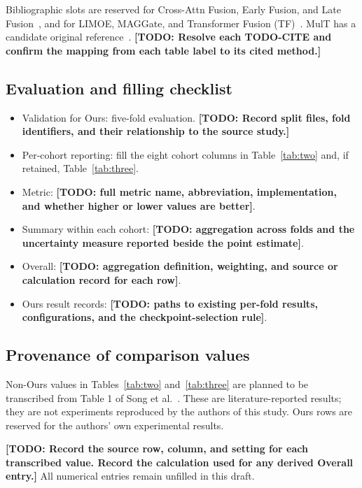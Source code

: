 \documentclass[pdflatex,sn-vancouver-num]{sn-jnl}
\newcommand{\TODO}[1]{\textbf{[TODO: #1]}}
\begin{document}
Bibliographic slots are reserved for Cross-Attn Fusion,
Early Fusion, and Late Fusion~\cite{todo_cross_attention_fusion,
todo_early_fusion,todo_late_fusion}, and for LIMOE, MAGGate, and
Transformer Fusion (TF)~\cite{todo_limoe,todo_maggate,
todo_transformer_fusion}.
MulT has a candidate original reference~\cite{tsai2019mult}.
\TODO{Resolve each TODO-CITE and confirm the mapping from each
table label to its cited method.}

\subsection{Evaluation and filling checklist}
\begin{itemize}
  \item Validation for Ours: five-fold evaluation.
  \TODO{Record split files, fold identifiers, and their relationship
  to the source study.}
  \item Per-cohort reporting: fill the eight cohort columns in
  Table~\ref{tab:two} and, if retained, Table~\ref{tab:three}.
  \item Metric: \TODO{full metric name, abbreviation, implementation,
  and whether higher or lower values are better}.
  \item Summary within each cohort: \TODO{aggregation across folds
  and the uncertainty measure reported beside the point estimate}.
  \item Overall: \TODO{aggregation definition, weighting, and
  source or calculation record for each row}.
  \item Ours result records: \TODO{paths to existing per-fold results,
  configurations, and the checkpoint-selection rule}.
\end{itemize}

\subsection{Provenance of comparison values}
Non-Ours values in Tables~\ref{tab:two} and~\ref{tab:three} are planned
to be transcribed from Table 1 of Song et
al.~\cite{song2026cancer_type_aware}. These are literature-reported
results; they are not experiments reproduced by the authors of this
study. Ours rows are reserved for the authors' own experimental results.

\TODO{Record the source row, column, and setting for each transcribed
value. Record the calculation used for any derived Overall entry.}
All numerical entries remain unfilled in this draft.
\end{document}
